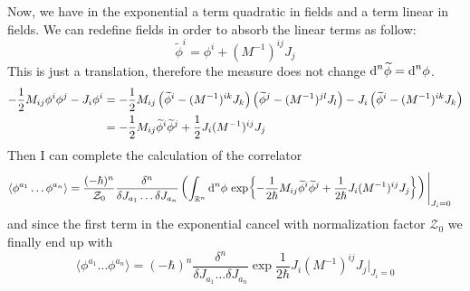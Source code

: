 \documentclass[../main/main.tex]{subfiles}
\begin{document}
Now, we have in the exponential a term quadratic in fields and a term linear in fields. We can redefine fields in order to absorb the linear terms as follow:
\[\widetilde\phi^i=\phi^i+(M^{-1})^{ij}J_j\]
This is just a translation, therefore the measure does not change $\textup{d}^n\widetilde\phi=\textup{d}^n\phi$. 
\begin{align*}
-\frac12M_{ij}\phi^i\phi^j-J_i\phi^i
&=-\frac12M_{ij}\left(\widetilde\phi^i-(M^{-1})^{ik}J_k\right)\left(\widetilde\phi^j-(M^{-1})^{jl}J_l\right)-J_i\left(\widetilde\phi^i-(M^{-1})^{ik}J_k\right)\\
&=-\frac12M_{ij}\widetilde\phi^i\widetilde\phi^j+\frac12J_i(M^{-1})^{ij}J_j
\end{align*}
Then I can complete the calculation of the correlator
\begin{align*}
\langle\phi^{a_1}\dots\phi^{a_n}\rangle
&=\frac{(-\hbar)^n}{\mathcal Z_0}\frac{\delta^n}{\delta J_{a_1}\dots \delta J_{a_n}}\left(\int_{\mathbb{R}^n}\textup{d}^n\phi\,\exp{-\frac1{2\hbar}M_{ij}\widetilde\phi^i\widetilde\phi^j+\frac1{2\hbar}J_i(M^{-1})^{ij}J_j}\right)\Bigg\vert_{J_i=0}
\end{align*}
and since the first term in the exponential cancel with normalization factor $\mathcal Z_0$ we finally end up with
\begin{equation}\label{eqn:0-dim-corr-fin}\boxed{
\langle\phi^{a_1}\dots\phi^{a_n}\rangle
=(-\hbar)^n\frac{\delta^n}{\delta J_{a_1}\dots \delta J_{a_n}}\exp{\frac1{2\hbar}J_i(M^{-1})^{ij}J_j}\Bigg\vert_{J_i=0}
}\end{equation}
\end{document}
